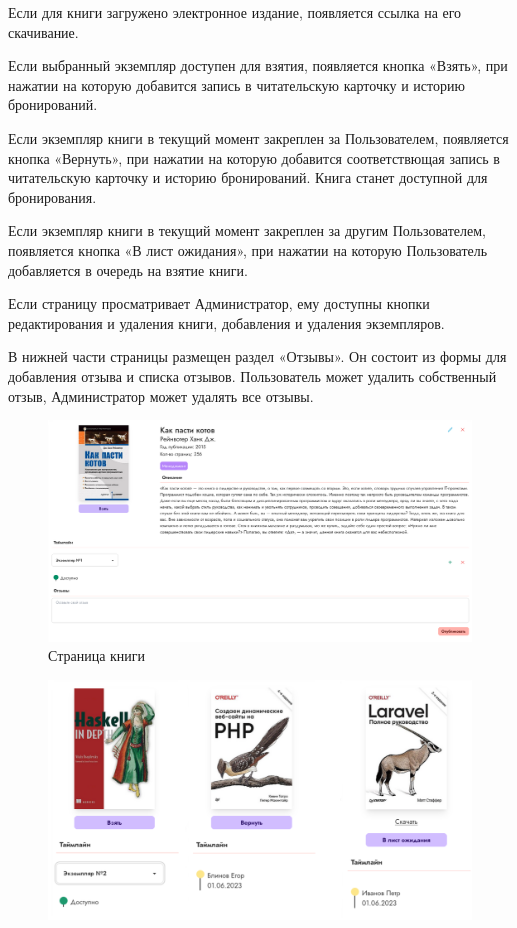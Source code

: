 \documentclass[project.tex]{subfiles}
\begin{document}
\begin{enumerate}
    Если для книги загружено электронное издание, появляется ссылка на его скачивание.
    \par
    Если выбранный экземпляр доступен для взятия, появляется кнопка «Взять», при нажатии на которую добавится запись в читательскую карточку и историю бронирований.
    \par
    Если экземпляр книги в текущий момент закреплен за Пользователем, появляется кнопка «Вернуть», при нажатии на которую добавится соответствющая запись в читательскую карточку и историю бронирований. Книга станет доступной для бронирования.
    \par
    Если экземпляр книги в текущий момент закреплен за другим Пользователем, появляется кнопка «В лист ожидания», при нажатии на которую Пользователь добавляется в очередь на взятие книги.
    \par
    Если страницу просматривает Администратор, ему доступны кнопки редактирования и удаления книги, добавления и удаления экземпляров.
    \par
    В нижней части страницы размещен раздел «Отзывы». Он состоит из формы для добавления отзыва и списка отзывов. Пользователь может удалить собственный отзыв, Администратор может удалять все отзывы.
    \begin{figure}[H]
       \label{pic:book}
       \includegraphics[width=\textwidth, frame]{../../graphics/singlebook.png}
       \caption{Страница книги} 
    \end{figure}
    \begin{figure}[H]
       \label{pic:states}
       \includegraphics[width=\textwidth, frame]{../../graphics/bookstates.png}

\end{figure}
\end{enumerate}
\end{document}
